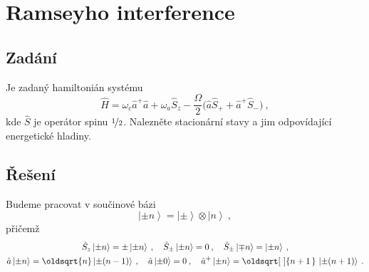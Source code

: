 \documentclass[10pt,a4paper]{article}
\renewcommand*{\sqrt}[2][\ ]{\oldsqrt[#1]{#2\,}\,}
\newcommand{\ket}[1]{\left| #1 \right>}
\begin{document}
\section{Ramseyho interference}
\subsection{Zadání}
Je zadaný hamiltonián systému
\begin{equation*}
    \hat H
    = \omega_c \hat a^+ \hat a
    + \omega_a \hat S_z
    - \frac{\Omega}{2}
    \big( \hat a \hat S_+ + \hat a^+ \hat S_- \big)
    \: ,
\end{equation*}
kde $\hat S$ je operátor spinu $\nicefrac{1}{2}$.  Nalezněte stacionární stavy a jim odpovídající energetické hladiny.

\subsection{Řešení}
Budeme pracovat v součinové bázi
\begin{equation*}
    \ket{\pm n} = \ket{\pm} \otimes \ket{n} \: ,
\end{equation*}
přičemž
\begin{gather*}
    \hat S_z \ket{\pm n} = \pm \ket{\pm n} \: , \quad
    \hat S_\pm \ket{\pm n} = 0 \: , \quad
    \hat S_\pm \ket{\mp n} = \ket{\pm n} \: , \\
    \hat a \ket{\pm n} = \oldsqrt{n} \ket{\pm (n-1)} \: , \quad
    \hat a \ket{\pm 0} = 0 \: , \quad
    \hat a^+ \ket{\pm n} = \sqrt{n+1} \ket{\pm (n+1)} \: .
\end{gather*}
\end{document}
